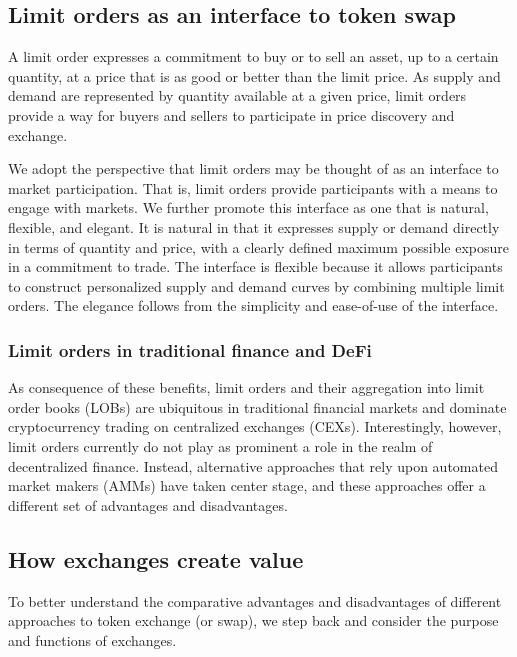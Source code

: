 \documentclass[11pt, reqno]{amsart}
\theoremstyle{definition}
\theoremstyle{remark}
\begin{document}
\subsection{Limit orders as an interface to token swap}
A limit order expresses a commitment to buy or to sell an asset, up to
a certain quantity, at a price that is as good or better than the limit price.
As supply and demand are represented by quantity available at a given price,
limit orders provide a way for buyers and sellers to participate in price
discovery and exchange.

We adopt the perspective that limit orders may be thought of as an interface
to market participation. That is, limit orders provide participants with a
means to engage with markets. We further promote this interface as one that
is natural, flexible, and elegant. It is natural in that it expresses
supply or demand directly in terms of quantity and price, with a clearly
defined maximum possible exposure in a commitment to trade. The interface is
flexible because it allows participants to construct personalized supply and
demand curves by combining multiple limit orders. The elegance follows from the
simplicity and ease-of-use of the interface.

\subsubsection{Limit orders in traditional finance and DeFi}
As consequence of these benefits, limit orders and their aggregation into
limit order books (LOBs) are ubiquitous in traditional financial markets
and dominate cryptocurrency trading on centralized exchanges (CEXs).
Interestingly, however, limit orders currently do not play as prominent a role
in the realm of decentralized finance. Instead, alternative approaches that
rely upon automated market makers (AMMs) have taken center stage, and these
approaches offer a different set of advantages and disadvantages.

\subsection{How exchanges create value}
To better understand the comparative advantages and disadvantages of different
approaches to token exchange (or swap), we step back and consider the purpose and
functions of exchanges.
\end{document}
